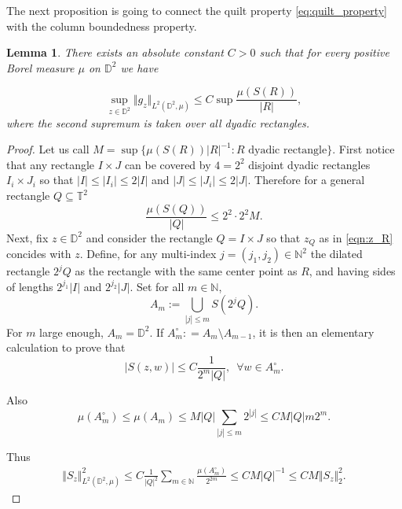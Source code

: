 \documentclass{amsart}
\numberwithin{equation}{section}
\newtheorem{lem}[thm]{Lemma}
\begin{document}


 


The next proposition is going to connect the quilt property \eqref{eq:quilt_property} 
with the column boundedness property. 

\begin{lem}\label{lem:colum_box}
 There exists an absolute constant $C>0 $ such that for every positive Borel
 measure $\mu $ on $\mathbb{D}^2 $ we have 

 \[ \sup_{z\in \mathbb{D}^2} \Vert g_z \Vert_{L^2(\mathbb{D}^2,\mu)} \leq C 
 \sup \frac{\mu(S(R))}{|R|}, \]
 where the second supremum is taken over all dyadic rectangles.

\end{lem}

\begin{proof}
Let us call $M = \sup\{ \mu(S(R))|R|^{-1}: R \,\, \text{dyadic rectangle} \}$.   
First notice that any rectangle $I\times J $  can be covered by $4=2^2$ disjoint dyadic rectangles $I_i\times J_i $ so that $ |I| \leq |I_i| \leq 2|I| $ and $ |J| \leq |J_i| \leq 2|J|. $  
	Therefore for a general rectangle $ Q \subseteq \mathbb{T}^2 $ 
 \[ \frac{\mu(S(Q))}{|Q|} \leq 2^2\cdot 2^2 M.   \]
Next, fix $ z\in \mathbb{D}^2 $ and consider the rectangle $Q=I\times J$ so that $z_Q$ as in \eqref{eqn:z_R} concides with $z $.
Define, for any multi-index $j = (j_1,j_2) \in \mathbb{N}^2 $ the dilated rectangle
$2^jQ $ as the rectangle with the same center point as $R $, and having sides 
of lengths $2^{j_1}|I|$ and  $2^{j_2}|J|$. 
Set for all $m\in\mathbb{N} $, 
\[ A_m:=\bigcup_{|j|\leq m}S(2^j Q). \]
For $m $ large enough, $A_m =\mathbb{D}^2 $. If $ A^\circ_m : = A_m \setminus A_{m-1} $, it is then an elementary calculation  to prove that 
\[ |S(z,w)| \leq C \frac{1}{2^m|Q|}, \,\,\, \forall w\in A_m^\circ. \]

Also 
\[ \mu(A_m^\circ) \leq \mu(A_m) \leq M|Q| \sum_{|j|\leq m}2^{|j|} \leq C M | Q | m2^m. \]

 Thus 
\begin{align*}
	\Vert S_z\Vert^2_{L^2(\mathbb{D}^2,\mu)} \leq C \frac{1}{|Q|^2} \sum_{m\in \mathbb{N}} \frac{\mu(A_m^\circ)}{2^{2m} } \leq C M|Q|^{-1} \leq C M \Vert S_z\Vert^2_2.
\end{align*}
\end{proof}
\end{document}
